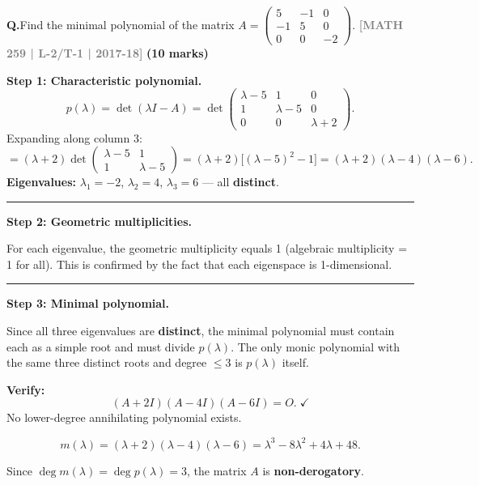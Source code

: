 \documentclass[12pt,a3paper]{article}
\newcommand{\yr}[1]{\hfill\textcolor{gray}{\small\textbf{[#1]}}}
\newcommand{\mk}[1]{\textcolor{orange!70!black}{\small\textbf{(#1 marks)}}}
\newcounter{qnum}
\newcommand{\Q}[1]{%
  \needspace{4\baselineskip}
  \refstepcounter{qnum}
  \vspace{6pt}
  \noindent\textbf{Q\theqnum.}\enspace #1\par
}
\begin{document}
\Q{Find the minimal polynomial of the matrix $A = \begin{pmatrix} 5 & -1 & 0 \\ -1 & 5 & 0 \\ 0 & 0 & -2 \end{pmatrix}$.
\yr{MATH 259 | L-2/T-1 | 2017-18} \mk{10}}

\begin{tcolorbox}[enhanced,breakable,
  colback=cE!4,colframe=cE,boxrule=0.8pt,arc=5pt,
  title={\textbf{Answer --- Minimal Polynomial of
    $A=\begin{pmatrix}5&-1&0\\-1&5&0\\0&0&-2\end{pmatrix}$}},
  fonttitle=\bfseries\color{white},colbacktitle=cE]

\textbf{Step 1: Characteristic polynomial.}
\[
  p(\lambda) = \det(\lambda I - A)
  = \det\begin{pmatrix}\lambda-5&1&0\\1&\lambda-5&0\\0&0&\lambda+2\end{pmatrix}.
\]
Expanding along column 3:
\[
  = (\lambda+2)\det\begin{pmatrix}\lambda-5&1\\1&\lambda-5\end{pmatrix}
  = (\lambda+2)\bigl[(\lambda-5)^2 - 1\bigr]
  = (\lambda+2)(\lambda-4)(\lambda-6).
\]
\textbf{Eigenvalues:} $\lambda_1 = -2$, $\lambda_2 = 4$, $\lambda_3 = 6$ — all \textbf{distinct}.

\medskip\textcolor{cE}{\rule{\textwidth}{0.4pt}}

\textbf{Step 2: Geometric multiplicities.}

For each eigenvalue, the geometric multiplicity equals 1 (algebraic multiplicity = 1
for all). This is confirmed by the fact that each eigenspace is 1-dimensional.

\medskip\textcolor{cE}{\rule{\textwidth}{0.4pt}}

\textbf{Step 3: Minimal polynomial.}

Since all three eigenvalues are \textbf{distinct}, the minimal polynomial must contain
each as a simple root and must divide $p(\lambda)$. The only monic polynomial with the
same three distinct roots and degree $\leq 3$ is $p(\lambda)$ itself.

\textbf{Verify:}
\[
  (A+2I)(A-4I)(A-6I) = O.\;\checkmark
\]
No lower-degree annihilating polynomial exists.

\[
  \boxed{m(\lambda) = (\lambda+2)(\lambda-4)(\lambda-6)
  = \lambda^3 - 8\lambda^2 + 4\lambda + 48.}
\]

Since $\deg m(\lambda) = \deg p(\lambda) = 3$, the matrix $A$ is
\textbf{non-derogatory}.

\end{tcolorbox}
\end{document}
